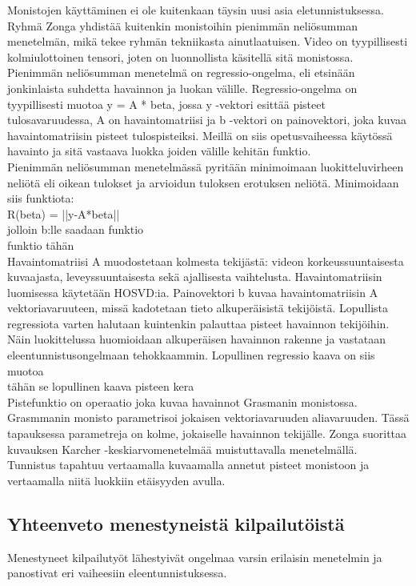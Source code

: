 Monistojen käyttäminen ei ole kuitenkaan täysin uusi asia eletunnistuksessa.
Ryhmä Zonga yhdistää kuitenkin monistoihin pienimmän neliösumman menetelmän, mikä tekee ryhmän tekniikasta ainutlaatuisen. 
Video on tyypillisesti kolmiulottoinen tensori, joten on luonnollista käsitellä sitä monistossa.
Pienimmän neliösumman menetelmä on regressio-ongelma, eli etsinään jonkinlaista suhdetta havainnon ja luokan välille.
Regressio-ongelma on tyypillisesti muotoa y = A * beta, jossa y -vektori esittää pisteet tulosavaruudessa, A on havaintomatriisi 
ja b -vektori on painovektori, joka kuvaa havaintomatriisin pisteet tulospisteiksi.
Meillä on siis opetusvaiheessa käytössä havainto ja sitä vastaava luokka joiden välille kehitän funktio.\\

Pienimmän neliösumman menetelmässä pyritään minimoimaan luokitteluvirheen neliötä eli oikean tulokset ja arvioidun tuloksen erotuksen neliötä.
Minimoidaan siis funktiota: \\
R(beta) = ||y-A*beta|| \\
jolloin b:lle saadaan funktio\\
funktio tähän\\

Havaintomatriisi A muodostetaan kolmesta tekijästä: videon korkeussuuntaisesta kuvaajasta, leveyssuuntaisesta sekä ajallisesta vaihtelusta.
Havaintomatriisin luomisessa käytetään HOSVD:ia. Painovektori b kuvaa havaintomatriisin A vektoriavaruuteen, missä kadotetaan tieto alkuperäisistä tekijöistä. 
Lopullista regressiota varten halutaan kuintenkin palauttaa pisteet havainnon tekijöihin.
Näin luokittelussa huomioidaan alkuperäisen havainnon rakenne ja vastataan eleentunnistusongelmaan tehokkaammin. 
Lopullinen regressio kaava on siis muotoa\\
tähän se lopullinen kaava pisteen kera\\
Pistefunktio on operaatio joka kuvaa havainnot Grasmanin monistossa. Grasmmanin monisto parametrisoi jokaisen vektoriavaruuden aliavaruuden.
Tässä tapauksessa parametreja on kolme, jokaiselle havainnon tekijälle.
Zonga suorittaa kuvauksen Karcher -keskiarvomenetelmää muistuttavalla menetelmällä.\\

Tunnistus tapahtuu vertaamalla kuvaamalla annetut pisteet monistoon ja vertaamalla niitä luokkiin etäisyyden avulla. \citep {6239180}\\


\subsection{Yhteenveto menestyneistä kilpailutöistä}
Menestyneet kilpailutyöt lähestyivät ongelmaa varsin erilaisin menetelmin ja panostivat eri vaiheesiin eleentunnistuksessa.
 
